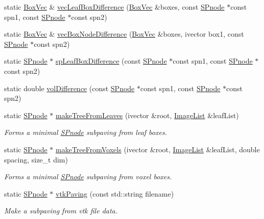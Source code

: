 \begin{DoxyCompactItemize}
static \hyperlink{namespacesubpavings_a322c2661740f6e6cc815fff0bfbd2623}{\-Box\-Vec} \& \hyperlink{classsubpavings_1_1SPnode_a8df2c2330b8da545a013d87cf1619e2b}{vec\-Leaf\-Box\-Difference} (\hyperlink{namespacesubpavings_a322c2661740f6e6cc815fff0bfbd2623}{\-Box\-Vec} \&boxes, const \hyperlink{classsubpavings_1_1SPnode}{\-S\-Pnode} $\ast$const spn1, const \hyperlink{classsubpavings_1_1SPnode}{\-S\-Pnode} $\ast$const spn2)
\item 
static \hyperlink{namespacesubpavings_a322c2661740f6e6cc815fff0bfbd2623}{\-Box\-Vec} \& \hyperlink{classsubpavings_1_1SPnode_a10a7bea8a44da192fe174d1d04284d3b}{vec\-Box\-Node\-Difference} (\hyperlink{namespacesubpavings_a322c2661740f6e6cc815fff0bfbd2623}{\-Box\-Vec} \&boxes, ivector box1, const \hyperlink{classsubpavings_1_1SPnode}{\-S\-Pnode} $\ast$const spn2)
\item 
static \hyperlink{classsubpavings_1_1SPnode}{\-S\-Pnode} $\ast$ \hyperlink{classsubpavings_1_1SPnode_a5de03ca047d5250c8b2f42f8b29f2a3e}{sp\-Leaf\-Box\-Difference} (const \hyperlink{classsubpavings_1_1SPnode}{\-S\-Pnode} $\ast$const spn1, const \hyperlink{classsubpavings_1_1SPnode}{\-S\-Pnode} $\ast$const spn2)
\item 
static double \hyperlink{classsubpavings_1_1SPnode_a474c6fe9f99ba63eb6eff5c0577cc63a}{vol\-Difference} (const \hyperlink{classsubpavings_1_1SPnode}{\-S\-Pnode} $\ast$const spn1, const \hyperlink{classsubpavings_1_1SPnode}{\-S\-Pnode} $\ast$const spn2)
\item 
static \hyperlink{classsubpavings_1_1SPnode}{\-S\-Pnode} $\ast$ \hyperlink{classsubpavings_1_1SPnode_a28c48af012e0a5b96236dcf12ffbae93}{make\-Tree\-From\-Leaves} (ivector \&root, \hyperlink{namespacesubpavings_acf161e8d79f04bf197a33277dd633f6d}{\-Image\-List} \&leaf\-List)
\begin{DoxyCompactList}\small\item\em \-Forms a minimal \hyperlink{classsubpavings_1_1SPnode}{\-S\-Pnode} subpaving from leaf boxes. \end{DoxyCompactList}\item 
static \hyperlink{classsubpavings_1_1SPnode}{\-S\-Pnode} $\ast$ \hyperlink{classsubpavings_1_1SPnode_a4e11f6bd7a176b33a25f3700751c4a08}{make\-Tree\-From\-Voxels} (ivector \&root, \hyperlink{namespacesubpavings_acf161e8d79f04bf197a33277dd633f6d}{\-Image\-List} \&leaf\-List, double spacing, size\-\_\-t dim)
\begin{DoxyCompactList}\small\item\em \-Forms a minimal \hyperlink{classsubpavings_1_1SPnode}{\-S\-Pnode} subpaving from voxel boxes. \end{DoxyCompactList}\item 
static \hyperlink{classsubpavings_1_1SPnode}{\-S\-Pnode} $\ast$ \hyperlink{classsubpavings_1_1SPnode_aa42de2dd7951c3fa60ab9e95ebf0c4aa}{vtk\-Paving} (const std\-::string filename)
\begin{DoxyCompactList}\small\item\em \-Make a subpaving from vtk file data. \end{DoxyCompactList}\end{DoxyCompactItemize}
